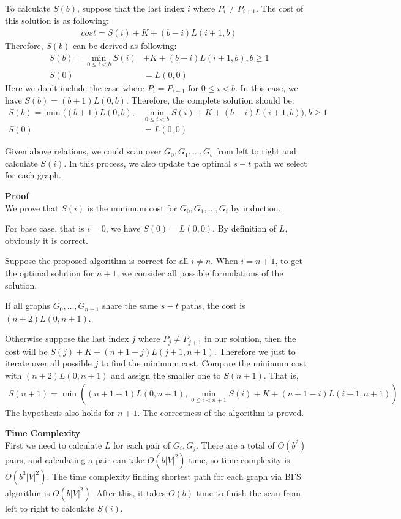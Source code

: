\documentclass{article}
\newcommand{\Complexity}{\vspace{0.3cm} \noindent\textbf{Time Complexity} \\}
\newcommand{\Proof}{\vspace{0.3cm} \noindent\textbf{Proof} \\}
\begin{document}
To calculate $S(b)$, suppose that the last index $i$ where $P_i \neq P_{i+1}$. The cost of this
solution is as following:
\begin{align}
  cost = S(i) + K + (b - i)L(i+1, b)
\end{align}
Therefore, $S(b)$ can be derived as following:
\begin{align}
  S(b) = \min_{0\leq i < b} S(i) & + K + (b-i)L(i+1, b), b \geq 1\\
  S(0) &= L(0,0)
\end{align}
Here we don't include the case where $P_i = P_{i+1}$ for $ 0 \leq i < b$. In this case, we have 
$S(b) = (b+1)L(0, b)$. Therefore, the complete solution should be:
\begin{align}
  S(b) = \min((b+1)L(0,b), & \min_{0\leq i < b} S(i) + K + (b-i)L(i+1, b)), b\geq 1 \\
  S(0) &= L(0, 0)
\end{align}

Given above relations, we could scan over $G_0, G_1, \dots, G_b$ from left to right and calculate 
$S(i)$. In this process, we also update the optimal $s-t$ path we select for each graph. 

\Proof
We prove that $S(i)$ is the minimum cost for $G_0, G_1, \dots, G_i$ by induction.

For base case, that is $i=0$, we have $S(0) = L(0,0)$. By definition of $L$, obviously it is
correct.

Suppose the proposed algorithm is correct for all $i \neq n$. When $i = n+1$, to get the optimal
solution for $n+1$, we consider all possible formulations of the solution. 

If all graphs $G_0, \dots, G_{n+1}$ share the same $s-t$ paths, the cost is $(n+2)L(0, n+1)$.

Otherwise suppose the last index 
$j$ where $P_j \neq P_{j+1}$ in our solution, then the cost will be $S(j) + K + (n+1-j) L(j+1,
n+1)$. Therefore we just to iterate over all possible $j$ to find the minimum cost. Compare the
minimum cost with $(n+2)L(0,n+1)$ and assign the smaller one to $S(n+1)$. That is,
\begin{align}
  S(n+1) = \min((n+1+1)L(0,n+1), \min_{0\leq i < n+1} S(i) + K + (n+1-i)L(i+1, n+1))
\end{align}
The hypothesis also holds for $n+1$. The correctness of the algorithm is proved.

\Complexity
First we need to calculate $L$ for each pair of $G_i, G_j$. There are a total of $O(b^2)$ pairs, and
calculating a pair can take $O(b|V|^2)$ time, so time complexity is $O(b^3 |V|^2)$. 
The time complexity finding shortest path for each graph via BFS algorithm is $O(b|V|^2)$.
After this, it takes $O(b)$ time to finish the scan from left to right to calculate $S(i)$. 
\end{document}
